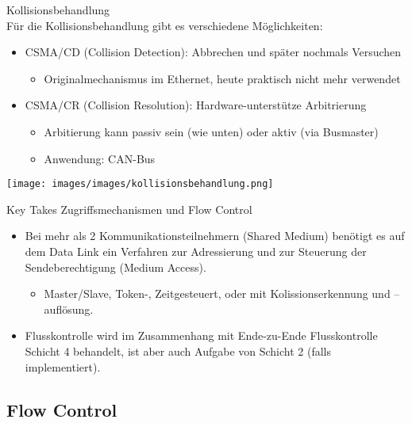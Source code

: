 \begin{concept}{Kollisionsbehandlung}\\
    Für die Kollisionsbehandlung gibt es verschiedene Möglichkeiten:
    \begin{itemize}
        \item CSMA/CD (Collision Detection): Abbrechen und später nochmals Versuchen
        \begin{itemize}
            \item Originalmechanismus im Ethernet, heute praktisch nicht mehr verwendet
        \end{itemize}
        \item CSMA/CR (Collision Resolution): Hardware-unterstütze Arbitrierung
        \begin{itemize}
            \item Arbitierung kann passiv sein (wie unten) oder aktiv (via Busmaster)
            \item Anwendung: CAN-Bus
        \end{itemize}
    \end{itemize}
        \texttt{[image: images/images/kollisionsbehandlung.png]}
\end{concept}

\begin{KR}{Key Takes Zugriffsmechanismen und Flow Control}
\begin{itemize}
    \item Bei mehr als 2 Kommunikationsteilnehmern (Shared Medium) benötigt es auf dem Data Link ein Verfahren zur Adressierung und zur Steuerung der Sendeberechtigung (Medium Access).
    \begin{itemize}
        \item Master/Slave, Token-, Zeitgesteuert, oder mit Kolissionserkennung und –auflösung.
    \end{itemize}
    \item Flusskontrolle wird im Zusammenhang mit Ende-zu-Ende Flusskontrolle Schicht 4 behandelt, ist aber auch Aufgabe von Schicht 2 (falls implementiert).
\end{itemize}
\end{KR}

\subsection{Flow Control}

